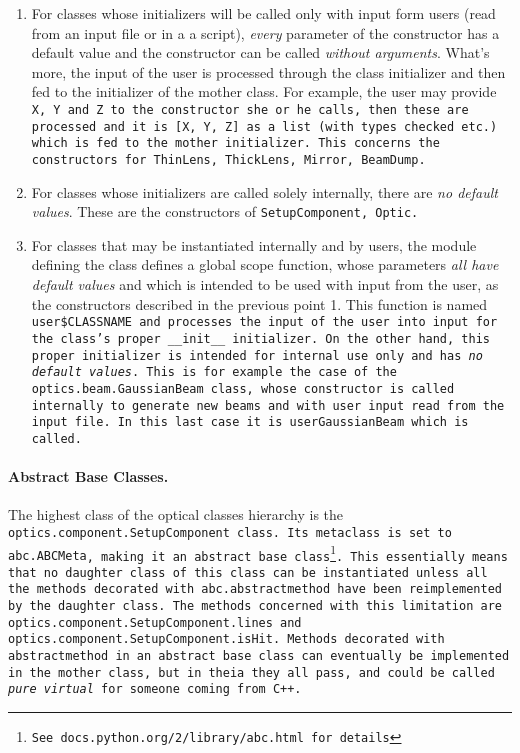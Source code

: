 \documentclass{article}
\begin{document}
\begin{enumerate}
\item For classes whose initializers will be called only with input form users (read from an input file or in a a script), \textit{every} parameter of the constructor has a default value and the constructor can be called \textit{without arguments}. What's more, the input of the user is processed through the class initializer and then fed to the initializer of the mother class. For example, the user may provide \tt{X}, \tt{Y} and \tt{Z} to the constructor she or he calls, then these are processed and it is \tt{[X, Y, Z]} as a list (with types checked etc.) which is fed to the mother initializer. This concerns the constructors for \tt{ThinLens}, \tt{ThickLens}, \tt{Mirror}, \tt{BeamDump}.

\item For classes whose initializers are called solely internally, there are \textit{no default values}. These are the constructors of \tt{SetupComponent}, \tt{Optic}.

\item For classes that may be instantiated internally and by users, the module defining the class defines a global scope function, whose parameters \textit{all have default values} and which is intended to be used with input from the user, as the constructors described in the previous point 1. This function is named \tt{user\$CLASSNAME} and processes the input of the user into input for the class's proper \tt{\_\_init\_\_} initializer. On the other hand, this proper initializer is intended for internal use only and has \textit{no default values}. This is for example the case of the \tt{optics.beam.GaussianBeam} class, whose constructor is called internally to generate new beams and with user input read from the input file. In this last case it is \tt{userGaussianBeam} which is called.
\end{enumerate}

\paragraph{Abstract Base Classes.}The highest class of the optical classes hierarchy is the \\ \tt{optics.component.SetupComponent} class. Its metaclass is set to \tt{abc.ABCMeta}, making it an abstract base class\footnote{See \tt{docs.python.org/2/library/abc.html} for details}. This essentially means that no daughter class of this class can be instantiated unless all the methods decorated with \tt{abc.abstractmethod} have been reimplemented by the daughter class. The methods concerned with this limitation are \tt{optics.component.SetupComponent.lines} and \tt{optics.component.SetupComponent.isHit}. Methods decorated with \tt{abstractmethod} in an abstract base class can eventually be implemented in the mother class, but in theia they all \tt{pass}, and could be called \textit{pure virtual} for someone coming from C++.
\end{document}
